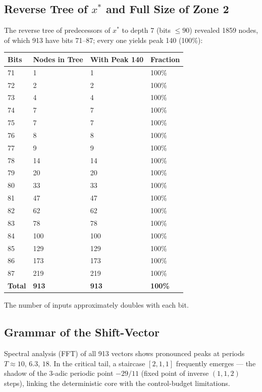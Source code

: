 \documentclass[12pt,a4paper]{article}
\theoremstyle{remark}
\begin{document}
\subsection{Reverse Tree of $x^*$ and Full Size of Zone 2}
The reverse tree of predecessors of $x^*$ to depth 7 (bits $\le 90$) revealed 1859 nodes, of which 913 have bits 71--87; every one yields peak 140 (100\%):
\begin{longtable}{llll}
\toprule
\textbf{Bits} & \textbf{Nodes in Tree} & \textbf{With Peak 140} & \textbf{Fraction} \\
\midrule
71 & 1 & 1 & 100\% \\ 72 & 2 & 2 & 100\% \\ 73 & 4 & 4 & 100\% \\
74 & 7 & 7 & 100\% \\ 75 & 7 & 7 & 100\% \\ 76 & 8 & 8 & 100\% \\
77 & 9 & 9 & 100\% \\ 78 & 14 & 14 & 100\% \\ 79 & 20 & 20 & 100\% \\
80 & 33 & 33 & 100\% \\ 81 & 47 & 47 & 100\% \\ 82 & 62 & 62 & 100\% \\
83 & 78 & 78 & 100\% \\ 84 & 100 & 100 & 100\% \\ 85 & 129 & 129 & 100\% \\
86 & 173 & 173 & 100\% \\ 87 & 219 & 219 & 100\% \\
\midrule
\textbf{Total} & \textbf{913} & \textbf{913} & \textbf{100\%} \\
\bottomrule
\end{longtable}
The number of inputs approximately doubles with each bit.

\subsection{Grammar of the Shift-Vector}
Spectral analysis (FFT) of all 913 vectors shows pronounced peaks at periods $T \approx 10$, $6.3$, $18$. In the critical tail, a staircase $[2,1,1]$ frequently emerges --- the shadow of the 3-adic periodic point $-29/11$ (fixed point of inverse $(1,1,2)$ steps), linking the deterministic core with the control-budget limitations.
\end{document}
